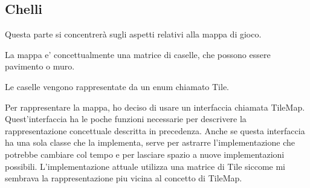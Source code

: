 \documentclass[a4paper,12pt]{report}
\begin{document}
    \subsection{Chelli}
    \par Questa parte si concentrerà sugli aspetti relativi alla mappa di gioco.
    \par
    \par La mappa e' concettualmente una matrice di caselle, che possono essere pavimento o muro.

    \par Le caselle vengono rappresentate da un enum chiamato Tile.

    \par
    \par Per rappresentare la mappa, ho deciso di usare un interfaccia chiamata TileMap.
    Quest'interfaccia ha le poche funzioni necessarie per descrivere la rappresentazione concettuale
    descritta in precedenza.
    Anche se questa interfaccia ha una sola classe che la implementa,
    serve per astrarre l'implementazione che potrebbe cambiare col tempo
    e per lasciare spazio a nuove implementazioni possibili.
    L'implementazione attuale utilizza una matrice di Tile siccome mi sembrava la rappresentazione piu vicina al concetto di TileMap.
\end{document}
